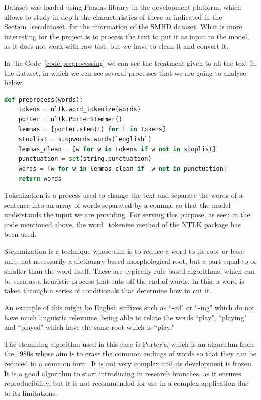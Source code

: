 Dataset was loaded using Pandas library in the development platform, which allows to study in depth the characteristics of these as indicated in the Section~\ref{sec:dataset} for the information of the SMHD dataset. What is more interesting for the project is to process the text to put it as input to the model, as it does not work with raw test, but we have to clean it and convert it.

In the Code~\ref{code:preprocessing} we can see the treatment given to all the text in the dataset, in which we can see several processes that we are going to analyse below.

\begin{lstlisting}[language=Python, caption={Preprocessing function for our data.}, label={code:preprocessing}]
def preprocess(words):
    tokens = nltk.word_tokenize(words)
    porter = nltk.PorterStemmer()
    lemmas = [porter.stem(t) for t in tokens]
    stoplist = stopwords.words(`english`)
    lemmas_clean = [w for w in tokens if w not in stoplist]
    punctuation = set(string.punctuation)
    words = [w for w in lemmas_clean if  w not in punctuation]
    return words
\end{lstlisting}

Tokenization is a process used to change the text and separate the words of a sentence into an array of words separated by a comma, so that the model understands the input we are providing. For serving this purpose, as seen in the code mentioned above, the word\_tokenize method of the NTLK package has been used.

Stemmization is a technique whose aim is to reduce a word to its root or base unit, not necessarily a dictionary-based morphological root, but a part equal to or smaller than the word itself. These are typically rule-based algorithms, which can be seen as a heuristic process that cuts off the end of words. In this, a word is taken through a series of conditionals that determine how to cut it.

An example of this might be English suffixes such as ``-ed" or ``-ing" which do not have much linguistic relevance, being able to relate the words ``play", ``playing" and ``played" which have the same root which is ``play."

The stemming algorithm used in this case is Porter's, which is an algorithm from the 1980s whose aim is to erase the common endings of words so that they can be reduced to a common form. It is not very complex and its development is frozen. It is a good algorithm to start introducing in research branches, as it ensures reproducibility, but it is not recommended for use in a complex application due to its limitations.

